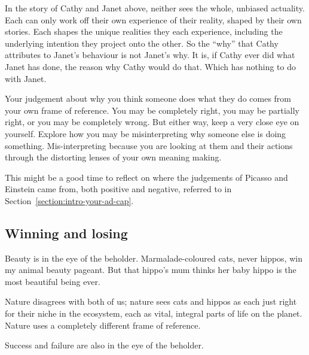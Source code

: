 In the story of Cathy and Janet above, neither sees the whole, unbiased actuality. Each can only work off their own experience of their reality, shaped by their own stories. Each shapes the unique realities they each experience, including the underlying intention they project onto the other. So the “why” that Cathy attributes to Janet's behaviour is not Janet's why. It is, if Cathy ever did what Janet has done, the reason why Cathy would do that. Which has nothing to do with Janet.


Your judgement about why you think someone does what they do comes from your own frame of reference. You may be completely right, you may be partially right, or you may be completely wrong. But either way, keep a very close eye on yourself. Explore how you may be misinterpreting why someone else is doing something. Mis-interpreting because you are looking at them and their actions through the distorting lenses of your own meaning making.


This might be a good time to reflect on where the judgements of Picasso and Einstein came from, both positive and negative, referred to in Section~\ref{section:intro-your-ad-cap}. 


\subsection{Winning and losing}
Beauty is in the eye of the beholder. Marmalade-coloured cats, never hippos, win my animal beauty pageant. But that hippo’s mum thinks her baby hippo is the most beautiful being ever. 


Nature disagrees with both of us; nature sees cats and hippos as each just right for their niche in the ecosystem, each as vital, integral parts of life on the planet. Nature uses a completely different frame of reference.


Success and failure are also in the eye of the beholder. 


